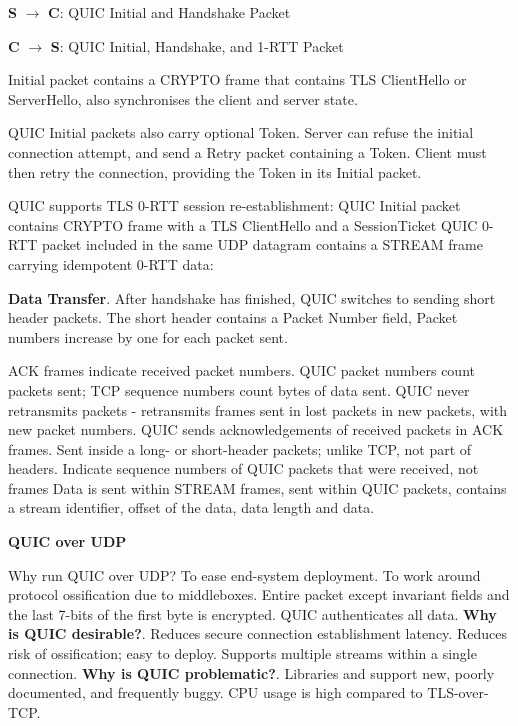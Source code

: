 \documentclass{article}
\begin{document}
\textbf{S} $\rightarrow$ \textbf{C}: QUIC Initial and Handshake Packet

\textbf{C} $\rightarrow$ \textbf{S}: QUIC Initial, Handshake, and 1-RTT Packet

Initial packet contains a CRYPTO frame that contains TLS ClientHello or ServerHello, also synchronises the client and server state.

QUIC Initial packets also carry optional Token.
Server can refuse the initial connection attempt, and send a Retry packet containing a Token.
Client must then retry the connection, providing the Token in its Initial packet.

QUIC supports TLS 0-RTT session re-establishment: QUIC Initial packet contains CRYPTO frame with a TLS ClientHello
and a SessionTicket QUIC 0-RTT packet included in the same UDP datagram contains a STREAM frame carrying idempotent 0-RTT data:


\textbf{Data Transfer}. After handshake has finished, QUIC switches to sending short header packets.
The short header contains a Packet Number field, Packet numbers increase by one for each packet sent.

ACK frames indicate received packet numbers. QUIC packet numbers count packets sent; TCP sequence numbers count bytes of data sent.
QUIC never retransmits packets {-} retransmits frames sent in lost packets in new packets, with new packet numbers.
QUIC sends acknowledgements of received packets in ACK frames.
Sent inside a long- or short-header packets; unlike TCP, not part of headers.
Indicate sequence numbers of QUIC packets that were received, not frames
Data is sent within STREAM frames, sent within QUIC packets, contains a stream identifier, offset of the data, data length and data.

\vspace{\baselineskip}
\textbf{QUIC over UDP}

Why run QUIC over UDP\@? To ease end-system deployment.
To work around protocol ossification due to middleboxes.
Entire packet except invariant fields and the last 7-bits of the first byte is encrypted.
QUIC authenticates all data.
\textbf{Why is QUIC desirable?}.
Reduces secure connection establishment latency.
Reduces risk of ossification; easy to deploy.
Supports multiple streams within a single connection.
\textbf{Why is QUIC problematic?}.
Libraries and support new, poorly documented, and frequently buggy.
CPU usage is high compared to TLS-over-TCP\@.

\clearpage
\end{document}
